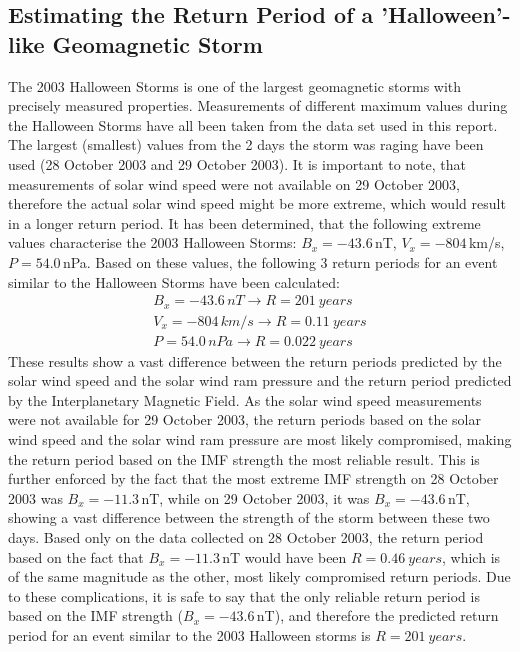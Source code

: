 \documentclass[12pt]{article}
\begin{document}
    \subsection{Estimating the Return Period of a 'Halloween'-like Geomagnetic Storm}\label{sec:halloween}
        The 2003 Halloween Storms is one of the largest geomagnetic storms with precisely measured properties. Measurements of different maximum values during the Halloween Storms have all been taken from the data set used in this report. The largest (smallest) values from the 2 days the storm was raging have been used (28 October 2003 and 29 October 2003). It is important to note, that measurements of solar wind speed were not available on 29 October 2003, therefore the actual solar wind speed might be more extreme, which would result in a longer return period. It has been determined, that the following extreme values characterise the 2003 Halloween Storms: $B_x=-43.6\,$nT, $V_x=-804\,$km/s, $P=54.0\,$nPa. Based on these values, the following 3 return periods for an event similar to the Halloween Storms have been calculated:
        \begin{equation}
            \begin{split}
                B_x=-43.6\, nT\rightarrow R=201\ years\\
                V_x=-804\, km/s\rightarrow R=0.11\ years\\
                P=54.0\, nPa\rightarrow R=0.022\ years
            \end{split}
        \end{equation}
        These results show a vast difference between the return periods predicted by the solar wind speed and the solar wind ram pressure and the return period predicted by the Interplanetary Magnetic Field. As the solar wind speed measurements were not available for 29 October 2003, the return periods based on the solar wind speed and the solar wind ram pressure are most likely compromised, making the return period based on the IMF strength the most reliable result. This is further enforced by the fact that the most extreme IMF strength on 28 October 2003 was $B_x=-11.3\,$nT, while on 29 October 2003, it was $B_x=-43.6\,$nT, showing a vast difference between the strength of the storm between these two days. Based only on the data collected on 28 October 2003, the return period based on the fact that $B_x=-11.3\,$nT would have been $R=0.46\ years$, which is of the same magnitude as the other, most likely compromised return periods. Due to these complications, it is safe to say that the only reliable return period is based on the IMF strength ($B_x=-43.6\,$nT), and therefore the predicted return period for an event similar to the 2003 Halloween storms is $R=201\ years$.
\end{document}
